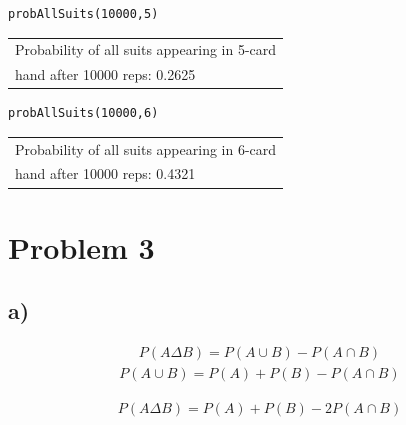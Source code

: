 \documentclass[11pt]{article}
\begin{document}
\begin{verbatim}
probAllSuits(10000,5)
\end{verbatim}

\begin{center}
\begin{tabular}{l}
Probability of all suits appearing in 5-card\\
hand after 10000 reps: 0.2625\\
\end{tabular}
\end{center}

\begin{verbatim}
probAllSuits(10000,6)
\end{verbatim}

\begin{center}
\begin{tabular}{l}
Probability of all suits appearing in 6-card\\
hand after 10000 reps: 0.4321\\
\end{tabular}
\end{center}

\section*{Problem 3}
\label{sec:org728f752}
\subsection*{a)}
\label{sec:org1d293bf}

\begin{equation}
  \begin{align}
    P(A \Delta B) = P(A \cup B) - P(A \cap B)
    \end{align}
\end{equation}
\begin{equation}
  \begin{align}
    P(A \cup B) = P(A) + P(B) - P(A \cap B)
    \end{align}
\end{equation}

\begin{equation}
  \begin{align}
    P(A \Delta B) = P(A) + P(B) - 2P(A \cap B)
    \end{align}
\end{equation}
\end{document}
